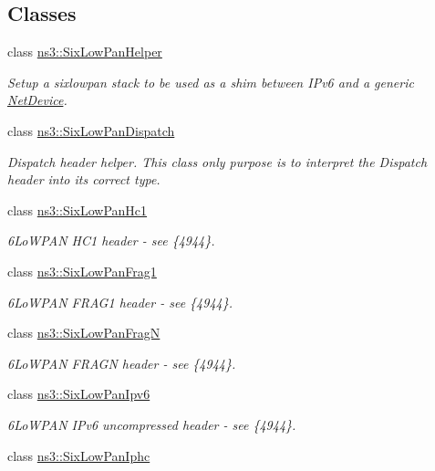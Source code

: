 \subsection*{Classes}
\begin{DoxyCompactItemize}
\item 
class \hyperlink{classns3_1_1SixLowPanHelper}{ns3\+::\+Six\+Low\+Pan\+Helper}
\begin{DoxyCompactList}\small\item\em Setup a sixlowpan stack to be used as a shim between I\+Pv6 and a generic \hyperlink{classns3_1_1NetDevice}{Net\+Device}. \end{DoxyCompactList}\item 
class \hyperlink{classns3_1_1SixLowPanDispatch}{ns3\+::\+Six\+Low\+Pan\+Dispatch}
\begin{DoxyCompactList}\small\item\em Dispatch header helper. This class only purpose is to interpret the Dispatch header into its correct type. \end{DoxyCompactList}\item 
class \hyperlink{classns3_1_1SixLowPanHc1}{ns3\+::\+Six\+Low\+Pan\+Hc1}
\begin{DoxyCompactList}\small\item\em 6\+Lo\+W\+P\+AN H\+C1 header -\/ see \{4944\}. \end{DoxyCompactList}\item 
class \hyperlink{classns3_1_1SixLowPanFrag1}{ns3\+::\+Six\+Low\+Pan\+Frag1}
\begin{DoxyCompactList}\small\item\em 6\+Lo\+W\+P\+AN F\+R\+A\+G1 header -\/ see \{4944\}. \end{DoxyCompactList}\item 
class \hyperlink{classns3_1_1SixLowPanFragN}{ns3\+::\+Six\+Low\+Pan\+FragN}
\begin{DoxyCompactList}\small\item\em 6\+Lo\+W\+P\+AN F\+R\+A\+GN header -\/ see \{4944\}. \end{DoxyCompactList}\item 
class \hyperlink{classns3_1_1SixLowPanIpv6}{ns3\+::\+Six\+Low\+Pan\+Ipv6}
\begin{DoxyCompactList}\small\item\em 6\+Lo\+W\+P\+AN I\+Pv6 uncompressed header -\/ see \{4944\}. \end{DoxyCompactList}\item 
class \hyperlink{classns3_1_1SixLowPanIphc}{ns3\+::\+Six\+Low\+Pan\+Iphc}

\end{DoxyCompactItemize}
